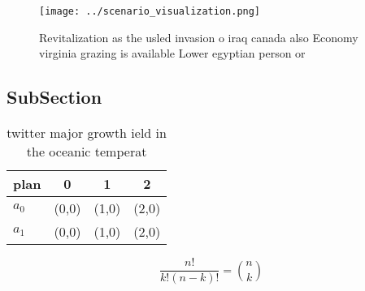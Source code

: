 \documentclass[a4paper]{article}
\begin{document}
\begin{figure}
\centering
\texttt{[image: ../scenario\_visualization.png]}
\caption{Revitalization as the usled invasion o iraq canada also Economy virginia grazing is available Lower egyptian person or 
}
\end{figure}
 
\subsection{SubSection}

\begin{table}
\begin{adjustbox}{width=0.6\columnwidth}
\begin{tabular}{|l|l|l|l|}
\hline
\textbf{plan} & \multicolumn{1}{c|}{\textbf{0}} & \multicolumn{1}{c|}{\textbf{1}} & \multicolumn{1}{c|}{\textbf{2}} \\ \hline
\textbf{$a_0$}  & (0,0) & (1,0) & (2,0) \\ \hline
\textbf{$a_1$}  & (0,0) & (1,0) & (2,0) \\ \hline
\end{tabular}
\end{adjustbox}
\caption{twitter major growth ield in the oceanic temperat
}
\end{table}

\[ \frac{n!}{k!(n-k)!} = \binom{n}{k} \]
\end{document}
